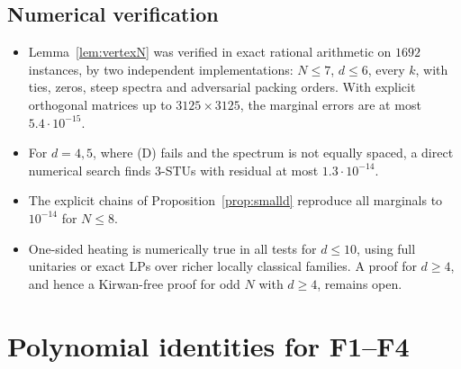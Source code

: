 \documentclass[11pt]{amsart}
\theoremstyle{definition}
\theoremstyle{remark}
\numberwithin{equation}{section}
\begin{document}
\subsection{Numerical verification}
\begin{itemize}
\item Lemma~\ref{lem:vertexN} was verified in exact rational arithmetic on $1692$ instances, by two independent
implementations: $N\le7$, $d\le6$, every $k$, with ties, zeros, steep spectra and adversarial packing orders. With
explicit orthogonal matrices up to $3125\times3125$, the marginal errors are at most $5.4\cdot10^{-15}$.
\item For $d=4,5$, where (D) fails and the spectrum is not equally spaced, a direct numerical search finds $3$-STUs
with residual at most $1.3\cdot10^{-14}$.
\item The explicit chains of Proposition~\ref{prop:smalld} reproduce all marginals to $10^{-14}$ for $N\le8$.
\item One-sided heating is numerically true in all tests for $d\le10$, using full unitaries or exact LPs over richer
locally classical families. A proof for $d\ge4$, and hence a Kirwan-free proof for odd $N$ with $d\ge4$, remains open.
\end{itemize}

\appendix
\section{Polynomial identities for F1--F4}\label{app:poly}
\end{document}
